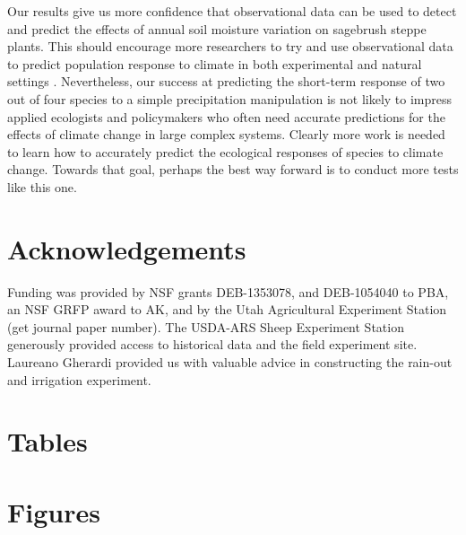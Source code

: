\documentclass[11pt]{article}
\begin{document}
\begin{doublespacing}
Our results give us more confidence that observational data can be used to detect and predict the effects of annual soil moisture variation on sagebrush steppe plants. This should encourage more researchers to try and use observational data to predict population response to climate in both experimental and natural settings \citep{houlahan_priority_2016,ehrlen_advancing_2016}. Nevertheless, our success at predicting the short-term response of two out of four species to a simple precipitation manipulation is not likely to impress applied ecologists and policymakers who often need accurate predictions for the effects of climate change in large complex systems. Clearly more work is needed to learn how to accurately predict the ecological responses of species to climate change. Towards that goal, perhaps the best way forward is to conduct more tests like this one.   
  
\section*{Acknowledgements}

Funding was provided by NSF grants DEB-1353078, and DEB-1054040 to PBA, an NSF GRFP award to AK, and by the Utah Agricultural Experiment Station (get journal paper number). The USDA-ARS Sheep Experiment Station generously provided access to historical data and the field experiment site. Laureano Gherardi provided us with valuable advice in constructing the rain-out and irrigation experiment. 

\newpage




\end{doublespacing} 

\clearpage
\newpage

\section*{Tables}













\clearpage
\newpage


\section*{Figures}
\end{document}
